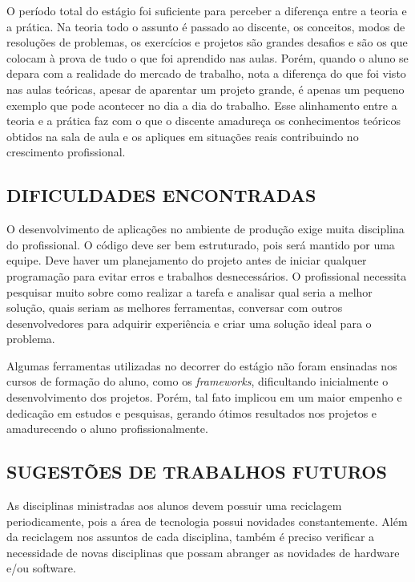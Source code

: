 \documentclass[
  12pt,            %
  openany,
  oneside,
  a4paper,         %
  english,      %
  brazil
]{article}
\numberwithin{figure}{section}
\numberwithin{table}{section}
\begin{document}
O período total do estágio foi suficiente para perceber a diferença entre a teoria e a prática. Na teoria todo o assunto é passado ao discente, os conceitos, modos de resoluções de problemas, os exercícios e projetos são grandes desafios e são os que colocam à prova de tudo o que foi aprendido nas aulas. Porém, quando o aluno se depara com a realidade do mercado de trabalho, nota a diferença do que foi visto nas aulas teóricas, apesar de aparentar um projeto grande, é apenas um pequeno exemplo que pode acontecer no dia a dia do trabalho. Esse alinhamento entre a teoria e a prática faz com o que o discente amadureça os conhecimentos teóricos obtidos na sala de aula e os apliques em situações reais contribuindo no crescimento profissional.


\subsection{DIFICULDADES ENCONTRADAS}

O desenvolvimento de aplicações no ambiente de produção exige muita disciplina do profissional. O código deve ser bem estruturado, pois será mantido por uma equipe. Deve haver um planejamento do projeto antes de iniciar qualquer programação para evitar erros e trabalhos desnecessários. O profissional necessita pesquisar muito sobre como realizar a tarefa e analisar qual seria a melhor solução, quais seriam as melhores ferramentas, conversar com outros desenvolvedores para adquirir experiência e criar uma solução ideal para o problema.

Algumas ferramentas utilizadas no decorrer do estágio não foram ensinadas nos cursos de formação do aluno, como os \textit{frameworks}, dificultando inicialmente o desenvolvimento dos projetos. Porém, tal fato implicou em um maior empenho e dedicação em estudos e pesquisas, gerando ótimos resultados nos projetos e amadurecendo o aluno profissionalmente.


\subsection{SUGESTÕES DE TRABALHOS FUTUROS}

As disciplinas ministradas aos alunos devem possuir uma reciclagem periodicamente, pois a área de tecnologia possui novidades constantemente. Além da reciclagem nos assuntos de cada disciplina, também é preciso verificar a necessidade de novas disciplinas que possam abranger as novidades de hardware e/ou software.
\end{document}
